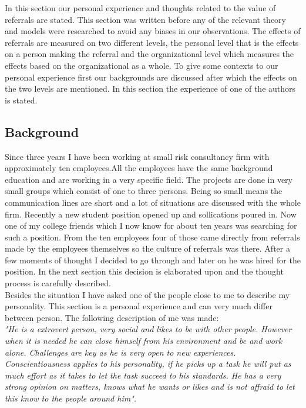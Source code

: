 \documentclass[Main.tex]{subfiles}
\begin{document}
In this section our personal experience and thoughts related to the value of referrals are stated. This section was written before any of the relevant theory and models were researched to avoid any biases in our observations. The effects of referrals are measured on two different levels, the personal level that is the effects on a person making the referral and the organizational level which measures the effects based on the organizational as a whole. To give some contexts to our personal experience first our backgrounds are discussed after which the effects on the two levels are mentioned. In this section the experience of one of the authors is stated. 

\subsection*{Background}

 Since three years I have been working at small risk consultancy firm with approximately ten employees.All the employees have the same background education and are working in a very specific field. The projects are done in very small groups which consist of one to three persons. Being so small means the communication lines are short and a lot of situations are discussed with the whole firm. Recently a new student position opened up and sollications poured in.  Now one of my college friends which I now know for about ten years was searching for such a position. From the ten employees four of those came directly from referrals made by the employees themselves so the culture of referrals was there. After a few moments of thought I decided to go through and later on he was hired for the position. In the next section this decision is elaborated upon and the thought process is carefully described. \\

Besides the situation I have asked one of the people close to me to describe my personality. This section is a personal experience and can very much differ between person. The following description of me was made: \\

\emph{"He is a extrovert person, very social and likes to be with other people. However when it is needed he can close himself from his environment and be and work alone. Challenges are key as he is very open to new experiences. Conscientiousness applies to his personality, if he picks up a task he will put as much effort as it takes to let the task succeed to his standards. He has a very strong opinion on matters, knows what he wants or likes and is not affraid to let this know to the people around him".}
\end{document}
